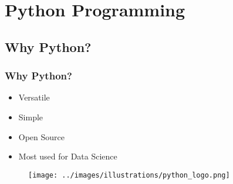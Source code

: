 

\newlength\myheight
\newlength\mydepth
\settototalheight{}
\settodepth{}
\setlength\fboxsep{0pt}
\newcommand*\inlinegraphics[1]{%
  \settototalheight\myheight{Xygp}%
  \settodepth\mydepth{Xygp}%
  \raisebox{-\mydepth}{\texttt{[image: \#1]}}%
}



\begin{frame}
   \titlepage
\end{frame}



\begin{frame}
   \tableofcontents
\end{frame}

\section{Python Programming}


\subsection{Why Python?}

\begin{frame}\frametitle{Why Python?}
   \begin{itemize}
      \item Versatile
      \item Simple
      \item Open Source
      \item Most used for Data Science
   \end{itemize}

   \vspace{1cm}
   \begin{minipage}{0.4\linewidth}
      \begin{figure}[H]
         \texttt{[image: ../images/illustrations/python\_logo.png]}
      \end{figure}
   \end{minipage}

\end{frame}


